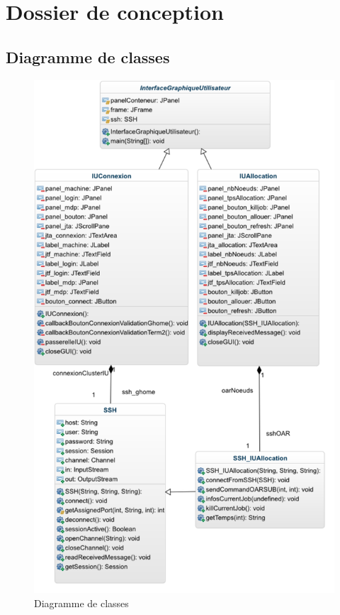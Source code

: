 \section{Dossier de conception}

\subsection{Diagramme de classes}
\label{sec:diagramme-de-classes}

\begin{figure}[h!]
  \centerline{
  \includegraphics[width=12cm]{images/diagramme_classes.png}}
  \caption{Diagramme de classes}
  \label{fig:diag_classes}
\end{figure}

